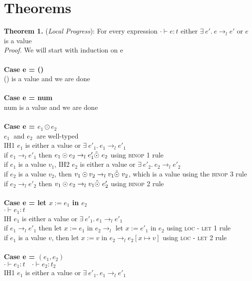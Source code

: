 \documentclass{article}
\begin{document}
\section{Theorems}
\textbf{Theorem 1.} (\textit{Local Progress}): For every expression $\cdot \vdash e : t$ either $  \exists \ e'.\ e \to_l e'$  or $e$ is a value
  \\
\textit{Proof.} We will start with induction on e \\\\
\textbf{Case e = ()} \\
() is a value and we are done \\ \\
\textbf{Case e = num} \\
num is a value and we are done \\ \\
\textbf{Case e = $e_1 \odot e_2$} \\
$e_1\ $ and $e_2\ $ are well-typed \\
IH1 $e_1$ is either a value or $  \exists \ e'_1.\ e_1 \to_l e'_1 $ \\
if $e_1 \to_l e'_1$ then $e_1 \odot e_2 \to_l e'_1 \Tilde{\odot} \ e_2$ using \textsc{binop 1} rule\\
if $e_1$ is a value $v_1$, IH2 $e_2$ is either a value or $  \exists \ e'_2.\ e_2 \to_l e'_2 $ \\
if $e_2$ is a value $v_2$, then $v_1 \odot v_2 \to_l v_1 \Tilde{\odot} \ v_2$, which is a value using the \textsc{binop 3} rule  \\
if $e_2 \to_l e'_2$ then $v_1 \odot e_2 \to_l v_1 \Tilde{\odot} \ e'_2$ using \textsc{binop 2} rule 
\\ \\
\textbf{Case e = let $x := e_1$ in $e_2$} \\
$\cdot \vdash e_1 : t$ \\
IH $e_1$ is either a value or $  \exists \ e'_1.\ e_1 \to_l e'_1 $ \\
if $e_1 \to_l e'_1$ then let $x := e_1$ in $e_2 \to_l $ let $x := e'_1$ in $e_2$ using \textsc{loc - let 1} rule\\
if $e_1$ is a value $v$, then let $x := v$ in $e_2 \to_l e_2[x \mapsto v]$ using \textsc{loc - let 2} rule
\\ \\
\textbf{Case e = $(e_1,e_2)$} \\
$\cdot \vdash e_1 : t \quad \cdot \vdash e_2 : t_2$\\
IH1 $e_1$ is either a value or $  \exists \ e'_1.\ e_1 \to_l e'_1 $ \\
\end{document}
